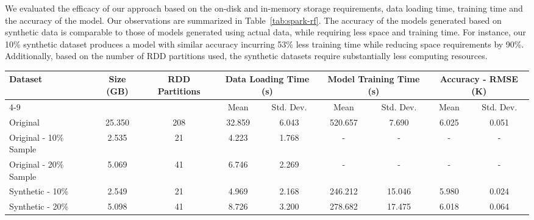We evaluated the efficacy of our approach based on the on-disk and in-memory storage requirements, data loading time, training time and the accuracy of the model.
Our observations are summarized in Table~\ref{tab:spark-rf}.
The accuracy of the models generated based on synthetic data is comparable to those of models generated using actual data, while requiring less space and training time.
For instance, our 10\% synthetic dataset produces a model with similar accuracy incurring 53\% less training time while reducing space requirements by 90\%. Additionally, based on the number of RDD partitions used, the synthetic datasets require substantially less computing resources.
%
\begin{table*}[ht!]
    \renewcommand{\arraystretch}{1.2}
    \caption{Comparing Random Forest based regression models generated by Spark MLlib using synthetic vs. real data \vspace{-1em}}
    \label{tab:spark-rf}
    \begin{center}
        \begin{tabularx}{\textwidth}{|X|c|c|c|c|c|c|c|c|}
            \hline
            \multirow{2}{*}{Dataset} & \multirow{2}{*}{Size (GB)} & \multirow{2}{*}{RDD Partitions} & \multicolumn{2}{c|}{\cellcolor[gray]{0.7}Data Loading Time (s)} &\multicolumn{2}{c|}{\cellcolor[gray]{0.7}Model Training Time (s)} & \multicolumn{2}{c|}{\cellcolor[gray]{0.7}Accuracy - RMSE (K)}\\
            \cline{4-9}
             & & & \cellcolor[gray]{0.9}Mean & \cellcolor[gray]{0.9}Std. Dev.  &  \cellcolor[gray]{0.9}Mean & \cellcolor[gray]{0.9}Std. Dev. &  \cellcolor[gray]{0.9}Mean & \cellcolor[gray]{0.9}Std. Dev. \\
            \hline
            Original & 25.350 & 208 & 32.859 & 6.043 & 520.657 & 7.690 & 6.025 & 0.051 \\
            \hline
            Original - 10\% Sample & 2.535 & 21 & 4.223 & 1.768 & - & - & -  & - \\
            \hline
            Original - 20\% Sample & 5.069 & 41 & 6.746 & 2.269 & - & - & - & - \\
            \hline
            Synthetic - 10\% & 2.549 & 21 & 4.969 & 2.168 & 246.212 & 15.046 & 5.980 & 0.024 \\
            \hline
            Synthetic - 20\% & 5.098 & 41 & 8.726 & 3.200 & 278.682 & 17.475 & 6.018 & 0.064 \\
            \hline
        \end{tabularx}
    \end{center}
    \vspace{-1em}
\end{table*}
%
